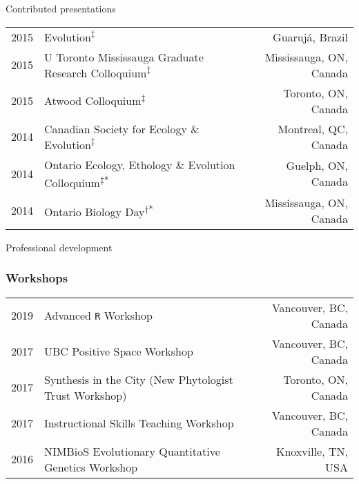 \documentclass[11pt]{article}
\begin{document}
\begin{rSection}{Contributed presentations}
\begin{tabular}{llr}
2015 & Evolution\textsuperscript{$\ddagger$} & Guaruj\'a, Brazil\\
2015 & U Toronto Mississauga Graduate Research Colloquium\textsuperscript{$\ddagger$} & Mississauga, ON, Canada\\
2015 & Atwood Colloquium\textsuperscript{$\ddagger$} & Toronto, ON, Canada\\
2014 & Canadian Society for Ecology \& Evolution\textsuperscript{$\ddagger$} & Montreal, QC, Canada\\
2014 & Ontario Ecology, Ethology \& Evolution Colloquium\textsuperscript{$\ddagger$*} & Guelph, ON, Canada\\
2014 & Ontario Biology Day\textsuperscript{$\dagger$*} & Mississauga, ON, Canada\\
\end{tabular}

\end{rSection}
\vspace{1em}

\noindent \begin{rSection}{Professional development} %

\subsubsection*{Workshops}
\begin{tabular}{llr}

2019 & Advanced \texttt{R} Workshop & Vancouver, BC, Canada\\
2017 & UBC Positive Space Workshop & Vancouver, BC, Canada\\
2017 & Synthesis in the City (New Phytologist Trust Workshop) & Toronto, ON, Canada\\
2017 & Instructional Skills Teaching Workshop & Vancouver, BC, Canada\\
2016 & NIMBioS Evolutionary Quantitative Genetics Workshop & Knoxville, TN, USA

\end{tabular}

\end{rSection}
\vspace{1em}
\end{document}
